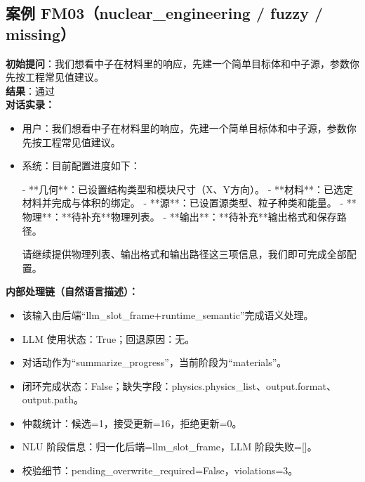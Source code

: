 \documentclass[11pt]{ctexart}
\begin{document}
\subsection{案例 FM03（nuclear\_engineering / fuzzy / missing）}
\textbf{初始提问}：我们想看中子在材料里的响应，先建一个简单目标体和中子源，参数你先按工程常见值建议。\\
\textbf{结果}：通过\\
\textbf{对话实录：}
\begin{itemize}
\item 用户：我们想看中子在材料里的响应，先建一个简单目标体和中子源，参数你先按工程常见值建议。
\item 系统：目前配置进度如下：

- **几何**：已设置结构类型和模块尺寸（X、Y方向）。
- **材料**：已选定材料并完成与体积的绑定。
- **源**：已设置源类型、粒子种类和能量。
- **物理**：**待补充**物理列表。
- **输出**：**待补充**输出格式和保存路径。

请继续提供物理列表、输出格式和输出路径这三项信息，我们即可完成全部配置。
\end{itemize}
\textbf{内部处理链（自然语言描述）：}
\begin{itemize}
\item 该输入由后端“llm\_slot\_frame+runtime\_semantic”完成语义处理。
\item LLM 使用状态：True；回退原因：无。
\item 对话动作为“summarize\_progress”，当前阶段为“materials”。
\item 闭环完成状态：False；缺失字段：physics.physics\_list、output.format、output.path。
\item 仲裁统计：候选=1，接受更新=16，拒绝更新=0。
\item NLU 阶段信息：归一化后端=llm\_slot\_frame，LLM 阶段失败=[]。
\item 校验细节：pending\_overwrite\_required=False，violations=3。
\end{itemize}
\end{document}
